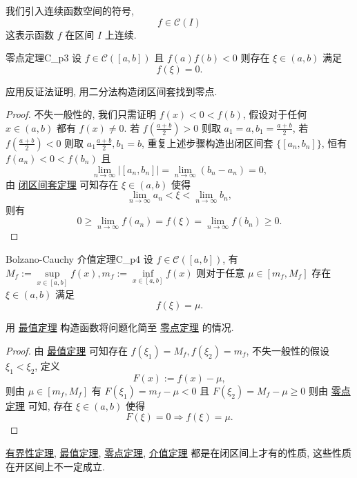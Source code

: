 \documentclass[cn,toc=twocol]{elegantbook}
\begin{document}
\vspace{0.5em}

我们引入连续函数空间的符号,
\[
	f \in \mathscr{C} (I)
\]
这表示函数 $f$ 在区间 $I$ 上连续.

\vspace{0.5em}

\begin{theorem}{零点定理}{C_p3}
设 $f \in \mathscr{C}([a,b])$ 且 $f(a)f(b) < 0$ 则存在 $\xi \in (a,b)$ 满足
	\[
		f(\xi) = 0.
	\]
\end{theorem}
\begin{idea*}
	应用反证法证明, 用二分法构造闭区间套找到零点.
\end{idea*}

\begin{proof}
	不失一般性的, 我们只需证明 $f(x) < 0 < f(b)$, 假设对于任何 $x \in (a,b)$ 都有 $f(x) \neq 0$. 若 $f\left(\frac{a+b}{2}\right) > 0$ 则取 $a_1 = a, b_1 = \frac{a+b}{2}$, 若 $f\left(\frac{a+b}{2}\right) < 0$ 则取 $a_1 \frac{a+b}{2}, b_1 = b$, 重复上述步骤构造出闭区间套 $\{[a_n,b_n]\}$, 恒有 $f(a_n) < 0 < f(b_n)$ 且
	\[
		 \lim_{n\to\infty}\lvert [a_n,b_n] \rvert = \lim_{n\to\infty} (b_n - a_n) = 0,
	\]
	由 \hyperref[thm:R2]{闭区间套定理} 可知存在 $\xi \in (a,b)$ 使得
	\[
		 \lim_{n\to\infty}a_n < \xi < \lim_{n\to\infty} b_n,
	\]
	则有
	\[
		0 \ge \lim_{n\to\infty}f(a_n) = f(\xi) = \lim_{n\to\infty}f(b_n) \ge 0.
	\]
\end{proof}



\begin{theorem}{Bolzano-Cauchy 介值定理}{C_p4}
设 $f \in \mathscr{C}([a,b])$, 有 $M_f := \sup\limits_{x\in[a,b]} f(x), m_f := \inf\limits_{x\in[a,b]} f(x)$ 则对于任意 $\mu \in [m_f,M_f]$ 存在 $\xi \in (a,b)$ 满足
	\[
		f(\xi) = \mu.
	\]
\end{theorem}
\begin{idea*}
	用 \hyperref[thm:C_p2]{最值定理} 构造函数将问题化简至 \hyperref[thm:C_p3]{零点定理} 的情况.
\end{idea*}
\begin{proof}
	由 \hyperref[thm:C_p2]{最值定理} 可知存在 $f(\xi_1) = M_f, f(\xi_2) = m_f$, 不失一般性的假设 $\xi_1 < \xi_2$, 定义
	\[
		F(x) := f(x) - \mu,
	\]
	则由 $\mu \in [m_f,M_f]$ 有 $F(\xi_1) = m_f - \mu < 0$ 且 $F(\xi_2) = M_f - \mu \ge 0$ 则由 \hyperref[thm:C_p1]{零点定理} 可知, 存在 $\xi \in (a,b)$ 使得
	\[
		F(\xi) = 0 \Rightarrow f(\xi) = \mu.
	\]
\end{proof}

\begin{remark}
\hyperref[thm:C_p1]{有界性定理}, \hyperref[thm:C_p2]{最值定理}, \hyperref[thm:C_p3]{零点定理}, \hyperref[thm:C_p4]{介值定理} 都是在闭区间上才有的性质, 这些性质在开区间上不一定成立.	
\end{remark}
\end{document}
